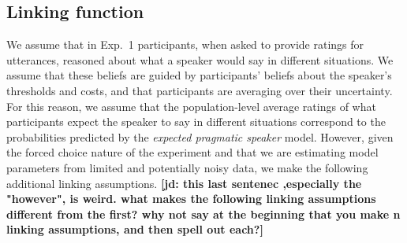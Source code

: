 \documentclass[lucida,biblatex]{sp} %
\newcommand{\jd}[1]{\textcolor{PinkyPurple}{\textbf{[jd: #1]}}}
\begin{document}



\subsection{Linking function}

We assume that in Exp.~1 participants, when asked to provide ratings for utterances, reasoned about what a speaker would say in different situations. 
We assume that these beliefs are guided by participants' beliefs about the speaker's thresholds and costs, and 
that participants are averaging over their uncertainty. For this reason, we assume that the population-level 
average ratings of what participants expect the speaker to say in different situations 
correspond to the probabilities predicted by the \textit{expected pragmatic speaker} model.
However, given the forced choice nature of the experiment and that we are estimating model 
parameters from limited and potentially noisy data, we make the following additional linking assumptions. \jd{this last sentenec ,especially the "however", is weird. what makes the following linking assumptions different from the first? why not say at the beginning that you make n linking assumptions, and then spell out each?}
\end{document}
